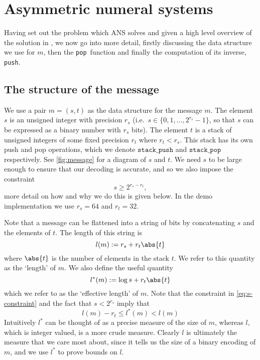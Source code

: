 \documentclass{article}
\theoremstyle{definition}
\newcommand{\push}{\texttt{push}}
\newcommand{\pop}{\texttt{pop}}
\begin{document}
\section{Asymmetric numeral systems}
  Having set out the problem which ANS solves and given a high level overview
  of the solution in , we now go into more detail, firstly
  discussing the data structure we use for \(m\), then the \pop\ function and
  finally the computation of its inverse, \push.


\subsection{The structure of the message}\label{sec:message}
  We use a pair \(m = (s, t)\) as the data structure for the message \(m\). The
  element \(s\) is an unsigned integer with precision \(r_s\) (i.e.\ \(s \in
  \{0, 1, \ldots, 2^{r_s} - 1\}\), so that \(s\) can be expressed as a binary
  number with \(r_s\) bits). The element \(t\) is a stack of unsigned
  integers of some fixed precision \(r_t\) where \(r_t < r_s\).  This stack has
  its own push and pop operations, which we denote \(\texttt{stack\_push}\) and
  \(\texttt{stack\_pop}\) respectively. See \cref{fig:message} for a diagram of
  \(s\) and \(t\).  We need \(s\) to be large enough to ensure that our
  decoding is accurate, and so we also impose the constraint
  \begin{equation}\label{eq:s-constraint}
    s\geq2^{r_s - r_t},
  \end{equation}
  more detail on how and why we do this is given below. In the demo
  implementation we use \(r_s = 64\) and \(r_t = 32\).

  Note that a message can be flattened into a string of bits by concatenating
  \(s\) and the elements of \(t\). The length of this string is
  \begin{equation}
    l(m) := r_s + r_t\abs{t}
  \end{equation}
  where \(\abs{t}\) is the number of elements in the stack \(t\). We refer to
  this quantity as the `length' of \(m\). We also define the useful quantity
  \begin{equation}
    l^*(m) := \log s + r_t\abs{t}
  \end{equation}
  which we refer to as the `effective length' of \(m\). Note that the
  constraint in \cref{eq:s-constraint} and the fact that \(s < 2^{r_s}\) imply
  that
  \begin{equation}\label{eq:effective-length}
    l(m) - r_t \leq l^*(m) < l(m)
  \end{equation}
  Intuitively \(l^*\) can be thought of as a precise measure of the size of
  \(m\), whereas \(l\), which is integer valued, is a more crude measure.
  Clearly \(l\) is ultimately the measure that we care most about, since it
  tells us the size of a binary encoding of \(m\), and we use \(l^*\) to prove
  bounds on \(l\).
\end{document}
